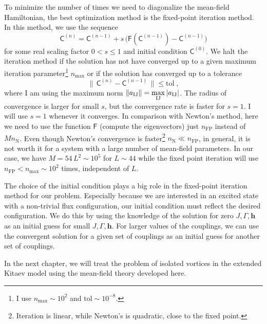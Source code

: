 To minimize the number of times we need to diagonalize the mean-field Hamiltonian, the best optimization method is the fixed-point iteration method. In this method, we use the sequence
\begin{equation}
    {\mathsf{C}}^{(n)} = {\mathsf{C}}^{(n-1)} + s \, \big( {\mathsf{F}}({\mathsf{C}}^{(n-1)}) - {\mathsf{C}}^{(n-1)} \big)
\end{equation}
for some real scaling factor $0< s\leq 1$ and initial condition ${\mathsf{C}}^{(0)}$.
We halt the iteration method if the solution has not have converged up to a given maximum iteration parameter\footnote{I use $n_{\text{max}}\sim 10^2$ and $\text{tol} \sim 10^{-8}$. } $n_{\text{max}}$ or if the solution has converged up to a tolerance
\begin{equation}
    \big\| \, {\mathsf{C}}^{(n)} - {\mathsf{C}}^{(n-1)} \, \big\| \leq \text{tol} \; ,
\end{equation}
where I am using the maximum norm $\| a_{{\mathrm{I}}{\mathrm{J}}} \| = \max\limits_{{\mathrm{I}}{\mathrm{J}}}|a_{{\mathrm{I}}{\mathrm{J}}}|$.
The radius of convergence is larger for small $s$, but the convergence rate is faster for $s=1$. I will use $s=1$ whenever it converges.
In comparison with Newton's method, here we need to use the function ${\mathsf{F}}$ (compute the eigenvectors) just $n_{\text{FP}}$ instead of $M n_{\text{N}}$. Even though Newton's convergence is faster\footnote{Iteration is linear, while Newton's is quadratic, close to the fixed point.} $n_{\text{N}} \ll n_{\text{FP}}$, in general, it is not worth it for a system with a large number of mean-field parameters. In our case,  we have $M = 54 \, L^2 \sim 10^5$ for $L \sim 44$ while the fixed point iteration will use $n_{\text{FP}} < n_{\text{max}}\sim 10^2 $ times, independent of $L$.

The choice of the initial condition plays a big role in the fixed-point iteration method for our problem.  Especially because we are interested in an excited state with a non-trivial flux configuration, our initial condition must reflect the desired configuration. We do this by using the knowledge of the solution for zero $J, \Gamma, \mathbf{h}$ as an initial guess for small $J, \Gamma, \mathbf{h}$. For larger values of the couplings, we can use the convergent solution for a given set of couplings as an initial guess for another set of couplings.

In the next chapter, we will treat the problem of isolated vortices in the extended Kitaev model using the mean-field theory developed here.





